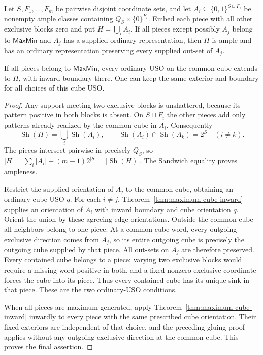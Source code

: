 \begin{theorem}
\label{thm:maxmin-common-cube-map-selection}
Let $S,F_1,\ldots,F_m$ be pairwise disjoint coordinate sets, and let
$A_i\subseteq\{0,1\}^{S\sqcup F_i}$ be nonempty ample classes containing
$Q_S\times\{0\}^{F_i}$. Embed each piece with all other exclusive
blocks zero and put $H=\bigcup_i A_i$.
If all pieces except possibly $A_j$ belong to $\mathsf{MaxMin}$ and
$A_j$ has a supplied ordinary representation, then $H$ is ample and
has an ordinary representation preserving every supplied out-set of
$A_j$.

If all pieces belong to $\mathsf{MaxMin}$, every ordinary USO on the
common cube extends to $H$, with inward boundary there. One can keep
the same exterior and boundary for all choices of this cube USO.
\end{theorem}

\begin{proof}
Any support meeting two exclusive blocks is unshattered, because its
pattern positive in both blocks is absent. On $S\sqcup F_i$ the other
pieces add only patterns already realized by the common cube in $A_i$.
Consequently
\[
 \operatorname{Sh}(H)=\bigcup_i\operatorname{Sh}(A_i),\qquad
 \operatorname{Sh}(A_i)\cap\operatorname{Sh}(A_k)=2^S\quad(i\ne k).
\]
The pieces intersect pairwise in precisely $Q_S$, so
$|H|=\sum_i|A_i|-(m-1)2^{|S|}=|\operatorname{Sh}(H)|$.
The Sandwich equality proves ampleness.

Restrict the supplied orientation of $A_j$ to the common cube, obtaining
an ordinary cube USO $q$. For each $i\ne j$,
Theorem~\ref{thm:maximum-cube-inward} supplies an orientation of $A_i$
with inward boundary and cube orientation $q$. Orient the union by
these agreeing edge orientations. Outside the common cube all neighbors
belong to one piece. At a common-cube word, every outgoing exclusive
direction comes from $A_j$, so its entire outgoing cube is precisely
the outgoing cube supplied by that piece. All out-sets on $A_j$ are
therefore preserved. Every contained cube belongs to a piece: varying
two exclusive blocks would require a missing word positive in both,
and a fixed nonzero exclusive coordinate forces the cube into its
piece. Thus every contained cube has its unique sink in that piece.
These are the two ordinary-USO conditions.

When all pieces are maximum-generated, apply
Theorem~\ref{thm:maximum-cube-inward} inwardly to every piece with the
same prescribed cube orientation. Their fixed exteriors are independent
of that choice, and the preceding gluing proof applies without any
outgoing exclusive direction at the common cube. This proves the final
assertion.
\end{proof}

